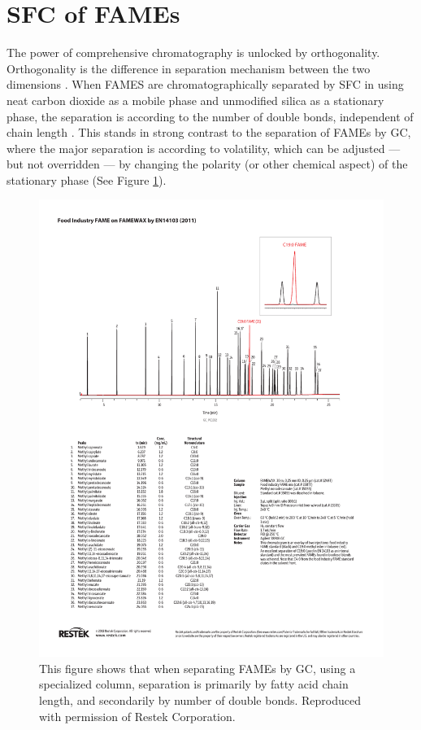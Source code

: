 \section{SFC of FAMEs}

The power of comprehensive chromatography is unlocked by orthogonality.
Orthogonality is the difference in separation mechanism between the two
dimensions \autocite{Marriott2012}. When FAMES are chromatographically separated
by SFC in using neat carbon dioxide as a mobile phase and unmodified silica as a
stationary phase, the separation is according to the number of double bonds,
independent of chain length \autocite{Robertson1991, Smith1994, Smith2001}. This
stands in strong contrast to the separation of FAMEs by GC, where the major
separation is according to volatility, which can be adjusted --- but not
overridden --- by changing the polarity (or other chemical aspect) of the
stationary phase (See Figure \ref{fig:RestekFAMEsGC}).

\begin{figure}
\centering
\includegraphics[width=\textwidth]{Figures/GC_PC1332.pdf}
\decoRule

\caption[Separation of FAME by GC]{This figure shows that when separating FAMEs
by GC, using a specialized column, separation is primarily by fatty acid chain
length, and secondarily by number of double bonds. Reproduced with permission of
Restek Corporation.}

\label{fig:RestekFAMEsGC}
\end{figure}

